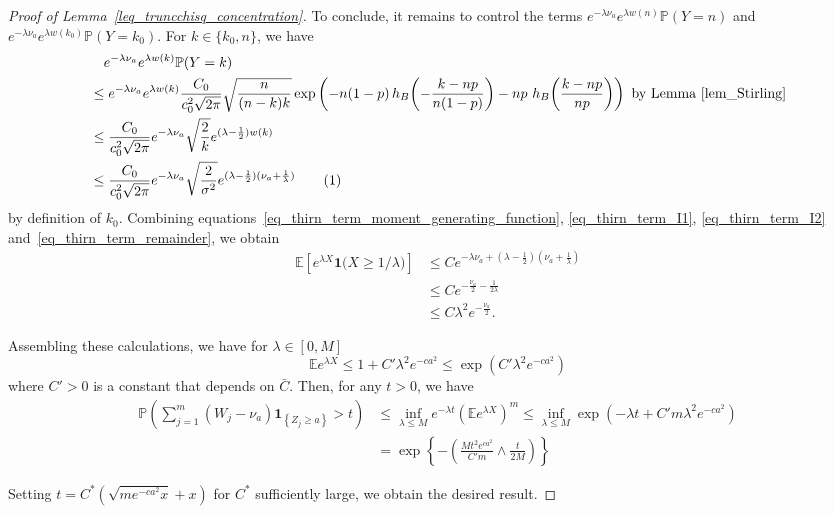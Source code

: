 \documentclass{article}
\newcommand{\one}{\mathbf{1}}
\newcommand\numberthis{\addtocounter{equation}{1}\tag{\theequation}}
\begin{document}
\begin{proof}[Proof of Lemma~\ref{leq_truncchisq_concentration}]
To conclude, it remains to control the terms $e^{-\lambda \nu_a}   e^{\lambda w(n)}\mathbb P(Y = n) $ and $ e^{-\lambda \nu_a}   e^{\lambda w(k_0)}\mathbb P(Y = k_0)$. 
For $k \in \{k_0,n\}$, we have
\begin{align*}
    & \quad e^{-\lambda \nu_a}   e^{\lambda w(k)}\mathbb P(Y = k) \\
    & \leq e^{-\lambda \nu_a}   e^{\lambda w(k)}\frac{C_0}{c_0^2\sqrt{2\pi}} \sqrt{\frac{n}{(n-k)k}} \exp\left(-n(1-p) \,h_B\!\left(-\frac{k-np}{n(1-p)}\right) - np \, \, h_B\!\left(\frac{k-np}{np}\right)\right) \text{ by Lemma~\ref{lem_Stirling}}\\
    & \leq \frac{C_0}{c_0^2\sqrt{2\pi}} e^{-\lambda \nu_a}\sqrt{\frac{2}{k}} e^{(\lambda - \frac{1}{2}) w(k)}\\
    & \leq \frac{C_0}{c_0^2\sqrt{2\pi}} e^{-\lambda \nu_a}\sqrt{\frac{2}{\sigma^2}} e^{(\lambda - \frac{1}{2}) (\nu_a + \frac{1}{\lambda})}\numberthis \label{eq_thirn_term_remainder}
\end{align*}
by definition of $k_0$. 
Combining equations~\eqref{eq_thirn_term_moment_generating_function}, \eqref{eq_thirn_term_I1}, \eqref{eq_thirn_term_I2} and~\eqref{eq_thirn_term_remainder}, we obtain
\begin{align*}
    \mathbb E\left[e^{\lambda X} \one{\big(X\geq1/\lambda\big)}\right] &\leq C e^{-\lambda \nu_a + (\lambda - \frac{1}{2})(\nu_a + \frac{1}{\lambda})}\\
    & \leq C e^{-\frac{\nu_a}{2} - \frac{1}{2\lambda}} \\
    & \leq C \lambda^2 e^{- \frac{\nu_a}{2}}.
\end{align*}



Assembling these calculations, we have for $\lambda \in [0,M]$
\[\mathbb{E} e^{\lambda X} \leq 1+C' \lambda^{2} e^{- ca^{2}} \leq \exp \left(C' \lambda^{2} e^{-ca^{2}}\right)\]
where $C' > 0$ is a constant that depends on $\bar{C}$. Then, for any $t>0$, we have
$$
\begin{aligned}
\mathbb{P}\left(\sum_{j=1}^{m}\left(W_{j}-\nu_{a}\right) \one_{\left\{Z_{j} \geq a\right\}}>t\right) & \leq \inf _{\lambda \leq M} e^{-\lambda t}\left(\mathbb{E} e^{\lambda X}\right)^{m} \leq \inf _{\lambda \leq M} \exp \left(-\lambda t + C' m \lambda^{2} e^{-ca^{2}}\right) \\
& =\exp \left\{-\left(\frac{Mt^{2} e^{ca^{2}}}{C' m} \wedge \frac{t}{2M}\right)\right\}
\end{aligned}
$$

Setting $t=C^*\left(\sqrt{m e^{-ca^{2}} x}+x\right)$ for $C^*$ sufficiently large, we obtain the desired result.
\end{proof}
\end{document}
